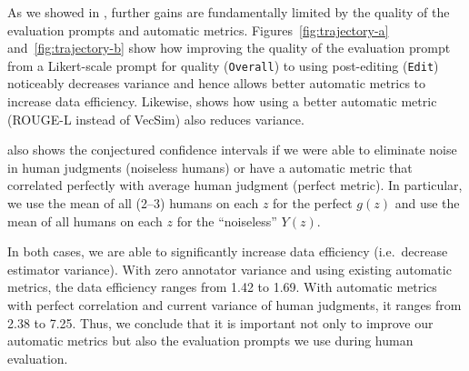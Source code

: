 As we showed in , further gains are fundamentally limited by the quality of the evaluation prompts and automatic metrics.
Figures~\ref{fig:trajectory-a} and~\ref{fig:trajectory-b} show how improving the quality of the evaluation prompt from a Likert-scale prompt for quality (\texttt{Overall}) to using post-editing (\texttt{Edit}) noticeably decreases variance and hence allows better automatic metrics to increase data efficiency.
Likewise,  shows how using a better automatic metric (ROUGE-L instead of VecSim) also reduces variance.

 also shows the conjectured confidence intervals if we were able to eliminate noise in human judgments (noiseless humans) or have a automatic metric that correlated perfectly with average human judgment (perfect metric).
In particular, we use the mean of all (2--3) humans on each $z$ for the perfect $g(z)$ and use the mean of all humans on each $z$ for the ``noiseless'' $Y(z)$.

In both cases, we are able to significantly increase data efficiency (i.e.\ decrease estimator variance).
With zero annotator variance and using existing automatic metrics,
the data efficiency ranges from 1.42 to 1.69. With automatic metrics with perfect correlation and current variance of human judgments,
it ranges from 2.38 to 7.25.
Thus, we conclude that it is important not only to improve our automatic metrics but also the evaluation prompts we use during human evaluation. 
